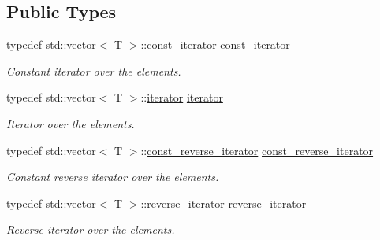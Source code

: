 \subsection*{Public Types}
\begin{CompactItemize}
\item 
\hypertarget{classdai_1_1smallSet_103c819872818d14a7234a1f618a815c}{
typedef std::vector$<$ T $>$::\hyperlink{classdai_1_1smallSet_103c819872818d14a7234a1f618a815c}{const\_\-iterator} \hyperlink{classdai_1_1smallSet_103c819872818d14a7234a1f618a815c}{const\_\-iterator}}
\label{classdai_1_1smallSet_103c819872818d14a7234a1f618a815c}

\begin{CompactList}\small\item\em Constant iterator over the elements. \item\end{CompactList}\item 
\hypertarget{classdai_1_1smallSet_254dd4f8cad9c7bce5522e9dbcfc4f49}{
typedef std::vector$<$ T $>$::\hyperlink{classdai_1_1smallSet_254dd4f8cad9c7bce5522e9dbcfc4f49}{iterator} \hyperlink{classdai_1_1smallSet_254dd4f8cad9c7bce5522e9dbcfc4f49}{iterator}}
\label{classdai_1_1smallSet_254dd4f8cad9c7bce5522e9dbcfc4f49}

\begin{CompactList}\small\item\em Iterator over the elements. \item\end{CompactList}\item 
\hypertarget{classdai_1_1smallSet_46882a9010267d41f447feb6aaf65cc1}{
typedef std::vector$<$ T $>$::\hyperlink{classdai_1_1smallSet_46882a9010267d41f447feb6aaf65cc1}{const\_\-reverse\_\-iterator} \hyperlink{classdai_1_1smallSet_46882a9010267d41f447feb6aaf65cc1}{const\_\-reverse\_\-iterator}}
\label{classdai_1_1smallSet_46882a9010267d41f447feb6aaf65cc1}

\begin{CompactList}\small\item\em Constant reverse iterator over the elements. \item\end{CompactList}\item 
\hypertarget{classdai_1_1smallSet_6dea3ee0aa40c4312e6278a7d17f516d}{
typedef std::vector$<$ T $>$::\hyperlink{classdai_1_1smallSet_6dea3ee0aa40c4312e6278a7d17f516d}{reverse\_\-iterator} \hyperlink{classdai_1_1smallSet_6dea3ee0aa40c4312e6278a7d17f516d}{reverse\_\-iterator}}
\label{classdai_1_1smallSet_6dea3ee0aa40c4312e6278a7d17f516d}

\begin{CompactList}\small\item\em Reverse iterator over the elements. \item\end{CompactList}\end{CompactItemize}
